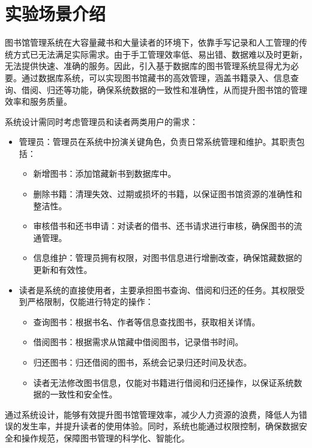 \documentclass[a4paper,14pt]{article}
\begin{document}
 
\tableofcontents
\newpage


\section{实验场景介绍}


图书馆管理系统在大容量藏书和大量读者的环境下，依靠手写记录和人工管理的传统方式已无法满足实际需求。由于手工管理效率低、易出错、数据难以及时更新，无法提供快速、准确的服务。因此，引入基于数据库的图书管理系统显得尤为必要。通过数据库系统，可以实现图书馆藏书的高效管理，涵盖书籍录入、信息查询、借阅、归还等功能，确保系统数据的一致性和准确性，从而提升图书馆的管理效率和服务质量。

系统设计需同时考虑管理员和读者两类用户的需求：
\begin{itemize}
    \item 管理员：管理员在系统中扮演关键角色，负责日常系统管理和维护。其职责包括：
    \begin{itemize}
        \item 新增图书：添加馆藏新书到数据库中。
        \item 删除书籍：清理失效、过期或损坏的书籍，以保证图书馆资源的准确性和整洁性。
        \item 审核借书和还书申请：对读者的借书、还书请求进行审核，确保图书的流通管理。
        \item 信息维护：管理员拥有权限，对图书信息进行增删改查，确保馆藏数据的更新和有效性。
    \end{itemize}
    \item 读者是系统的直接使用者，主要承担图书查询、借阅和归还的任务。其权限受到严格限制，仅能进行特定的操作：
    \begin{itemize}
        \item 查询图书：根据书名、作者等信息查找图书，获取相关详情。
        \item 借阅图书：根据需求从馆藏中借阅图书，记录借书时间。
        \item 归还图书：归还借阅的图书，系统会记录归还时间及状态。
        \item 读者无法修改图书信息，仅能对书籍进行借阅和归还操作，以保证系统数据的一致性和安全性。
    \end{itemize}
\end{itemize}
通过系统设计，能够有效提升图书馆管理效率，减少人力资源的浪费，降低人为错误的发生率，并提升读者的使用体验。同时，系统也能通过权限控制，确保数据安全和操作规范，保障图书管理的科学化、智能化。
\end{document}
